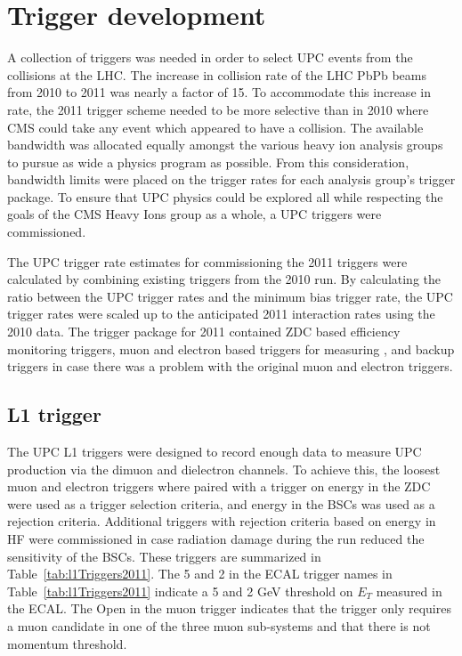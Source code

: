   \section{\label{sec:TrigDev} Trigger development}
    A collection of triggers was needed in order to select UPC events from the
      collisions at the LHC. 
    The increase in collision rate of the LHC PbPb beams from 2010 to 2011 was
      nearly a factor of 15. 
    To accommodate this increase in rate, the 2011 trigger scheme needed to be 
      more selective than in 2010 where CMS could take any event which 
      appeared to have a collision.
    The available bandwidth was allocated equally amongst the various heavy ion
      analysis groups to pursue as wide a physics program as possible.
    From this consideration, bandwidth limits were placed on the trigger rates
      for each analysis group's trigger package. 
    To ensure that UPC physics could be explored all while respecting the
      goals of the CMS Heavy Ions group as a whole, a UPC triggers were 
      commissioned. 
  
    The UPC trigger rate estimates for commissioning the 2011 triggers were 
      calculated by combining existing triggers from the 2010 run. 
    By calculating the ratio between the UPC trigger rates and the minimum bias
      trigger rate, the UPC trigger rates were scaled up to the anticipated 2011 
      interaction rates using the 2010 data.
    The trigger package for 2011 contained ZDC based efficiency monitoring 
      triggers, muon and electron based triggers for measuring \JPsi{}, and 
      backup triggers in case there was a problem with the original muon and 
      electron triggers.

    \subsection{\label{sec:l1Trigger} L1 trigger}
      The UPC L1 triggers were designed to record enough data to measure 
        UPC \JPsi{} production via the dimuon and dielectron channels.
      To achieve this, the loosest muon and electron triggers where paired with
        a trigger on energy in the ZDC were used as a trigger selection 
        criteria, and energy in the BSCs was used as a rejection criteria.
      Additional triggers with rejection criteria based on energy in HF were 
        commissioned in case radiation damage during the run reduced the 
        sensitivity of the BSCs.
      These triggers are summarized in Table~\ref{tab:l1Triggers2011}.
      The 5 and 2 in the ECAL trigger names in Table~\ref{tab:l1Triggers2011}
        indicate a 5 and 2 GeV threshold on $E_{T}$ measured in the ECAL.
      The Open in the muon trigger indicates that the trigger only 
        requires a muon candidate in one of the three muon sub-systems and that
        there is not momentum threshold.

